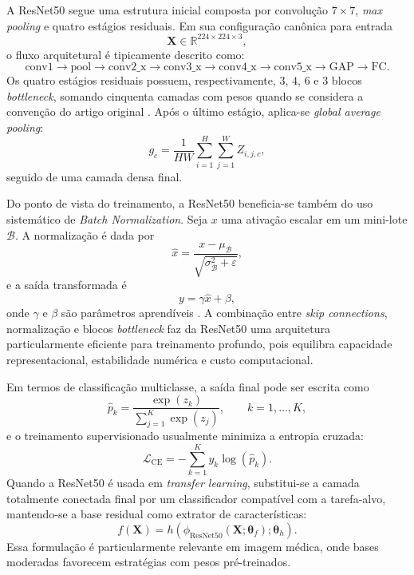 \documentclass[tcc,capa]{texufpel}
\begin{document}
A ResNet50 segue uma estrutura inicial composta por convolução \(7\times7\), \textit{max pooling} e quatro estágios residuais. Em sua configuração canônica para entrada
\begin{equation}
	\mathbf{X} \in \mathbb{R}^{224\times 224 \times 3},
\end{equation}
o fluxo arquitetural é tipicamente descrito como:
\begin{equation}
	\text{conv1} \rightarrow \text{pool} \rightarrow \text{conv2\_x} \rightarrow \text{conv3\_x} \rightarrow \text{conv4\_x} \rightarrow \text{conv5\_x} \rightarrow \text{GAP} \rightarrow \text{FC}.
\end{equation}
Os quatro estágios residuais possuem, respectivamente, \(3\), \(4\), \(6\) e \(3\) blocos \textit{bottleneck}, somando cinquenta camadas com pesos quando se considera a convenção do artigo original \cite{He2016}. Após o último estágio, aplica-se \textit{global average pooling}:
\begin{equation}
	g_c = \frac{1}{HW}\sum_{i=1}^{H}\sum_{j=1}^{W} Z_{i,j,c},
\end{equation}
seguido de uma camada densa final.

Do ponto de vista do treinamento, a ResNet50 beneficia-se também do uso sistemático de \textit{Batch Normalization}. Seja \(x\) uma ativação escalar em um mini-lote \(\mathcal{B}\). A normalização é dada por
\begin{equation}
	\hat{x} = \frac{x - \mu_{\mathcal{B}}}{\sqrt{\sigma_{\mathcal{B}}^2 + \varepsilon}},
\end{equation}
e a saída transformada é
\begin{equation}
	y = \gamma \hat{x} + \beta,
\end{equation}
onde \(\gamma\) e \(\beta\) são parâmetros aprendíveis \cite{Ioffe2015}. A combinação entre \textit{skip connections}, normalização e blocos \textit{bottleneck} faz da ResNet50 uma arquitetura particularmente eficiente para treinamento profundo, pois equilibra capacidade representacional, estabilidade numérica e custo computacional.

Em termos de classificação multiclasse, a saída final pode ser escrita como
\begin{equation}
	\hat{p}_k
	=
	\frac{\exp(z_k)}
	{\sum_{j=1}^{K}\exp(z_j)},
	\qquad k=1,\dots,K,
\end{equation}
e o treinamento supervisionado usualmente minimiza a entropia cruzada:
\begin{equation}
	\mathcal{L}_{\text{CE}}
	=
	-\sum_{k=1}^{K} y_k \log(\hat{p}_k).
\end{equation}
Quando a ResNet50 é usada em \textit{transfer learning}, substitui-se a camada totalmente conectada final por um classificador compatível com a tarefa-alvo, mantendo-se a base residual como extrator de características:
\begin{equation}
	f(\mathbf{X}) = h\!\left(\phi_{\text{ResNet50}}(\mathbf{X};\boldsymbol{\theta}_f);\boldsymbol{\theta}_h\right).
\end{equation}
Essa formulação é particularmente relevante em imagem médica, onde bases moderadas favorecem estratégias com pesos pré-treinados.
\end{document}
